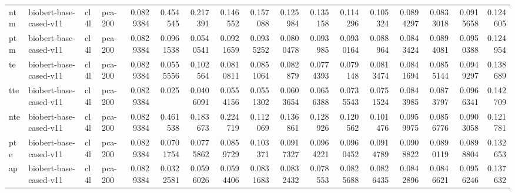 \begin{tabular}{llllrrrrrrrrrrrrr}
 ntm         & biobert-base-cased-v11 & cl4l             & pca-200               &        0.0829384 &       0.454545   &        0.217391  &        0.146552  &        0.157088  &        0.125984  &        0.135158  &        0.114296  &        0.105324  &        0.0894297 &         0.0833018 &         0.0915658 &         0.124605  \\
 ptm         & biobert-base-cased-v11 & cl4l             & pca-200               &        0.0829384 &       0.0961538  &        0.0540541 &        0.0921659 &        0.0935252 &        0.0800478 &        0.093985  &        0.0930164 &        0.088964  &        0.0843424 &         0.0894081 &         0.0950388 &         0.124954  \\
 te          & biobert-base-cased-v11 & cl4l             & pca-200               &        0.0829384 &       0.0555556  &        0.102564  &        0.0810811 &        0.0851064 &        0.082879  &        0.0774393 &        0.079148  &        0.0813474 &        0.0841694 &         0.0855144 &         0.0949297 &         0.138689  \\
 tte         & biobert-base-cased-v11 & cl4l             & pca-200               &        0.0829384 &       0.025      &        0.0406091 &        0.0554156 &        0.0551302 &        0.0603654 &        0.0656388 &        0.0735543 &        0.0751524 &        0.0843985 &         0.0873797 &         0.0966341 &         0.142709  \\
 nte         & biobert-base-cased-v11 & cl4l             & pca-200               &        0.0829384 &       0.461538   &        0.183673  &        0.224719  &        0.112069  &        0.136861  &        0.128926  &        0.120562  &        0.101476  &        0.0959975 &         0.0856776 &         0.0903058 &         0.121781  \\
 pte         & biobert-base-cased-v11 & cl4l             & pca-200               &        0.0829384 &       0.0701754  &        0.0775862 &        0.0859729 &        0.103371  &        0.0917327 &        0.0964221 &        0.0960452 &        0.0914789 &        0.0908822 &         0.0890119 &         0.0898804 &         0.132653  \\
 ap          & biobert-base-cased-v11 & cl4l             & pca-200               &        0.0829384 &       0.0322581  &        0.0596026 &        0.0594406 &        0.0831683 &        0.0832432 &        0.078553  &        0.0825688 &        0.0826435 &        0.0842896 &         0.0846621 &         0.0956246 &         0.137632  \\

\end{tabular}
